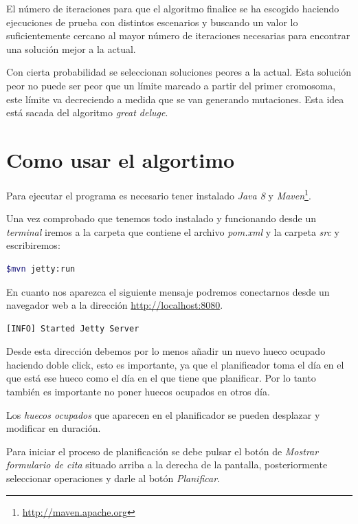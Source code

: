 \documentclass[11pt]{article}
\begin{document}
	El número de iteraciones para que el algoritmo finalice se ha escogido haciendo ejecuciones de prueba con distintos escenarios y buscando un valor lo suficientemente cercano al mayor número de iteraciones necesarias para encontrar una solución mejor a la actual.
	
	Con cierta probabilidad se seleccionan soluciones peores a la actual. Esta solución peor no puede ser peor que un límite marcado a partir del primer cromosoma, este límite va decreciendo a medida que se van generando mutaciones. Esta idea está sacada del algoritmo \textit{great deluge}.
	
	\section{Como usar el algortimo}
	
	Para ejecutar el programa es necesario tener instalado \textit{Java 8} y \textit{Maven}\footnote{\url{http://maven.apache.org}}.
	
	Una vez comprobado que tenemos todo instalado y funcionando desde un \textit{terminal} iremos a la carpeta que contiene el archivo \textit{pom.xml} y la carpeta \textit{src} y escribiremos:
	
	\begin{lstlisting}[language=bash]
	$mvn jetty:run
	\end{lstlisting}
	
	
	En cuanto nos aparezca el siguiente mensaje podremos conectarnos desde un navegador web a la dirección \url{http://localhost:8080}.
	
	\begin{lstlisting}[language=bash]
	[INFO] Started Jetty Server
	\end{lstlisting}
	
	Desde esta dirección debemos por lo menos añadir un nuevo hueco ocupado haciendo doble click, esto es importante, ya que el planificador toma el día en el que está ese hueco como el día en el que tiene que planificar. Por lo tanto también es importante no poner huecos ocupados en otros día.
	
	Los \textit{huecos ocupados} que aparecen en el planificador se pueden desplazar y modificar en duración.
	
	Para iniciar el proceso de planificación se debe pulsar el botón de \textit{Mostrar formulario de cita} situado arriba a la derecha de la pantalla, posteriormente seleccionar operaciones y darle al botón \textit{Planificar}.
	
\end{document}

